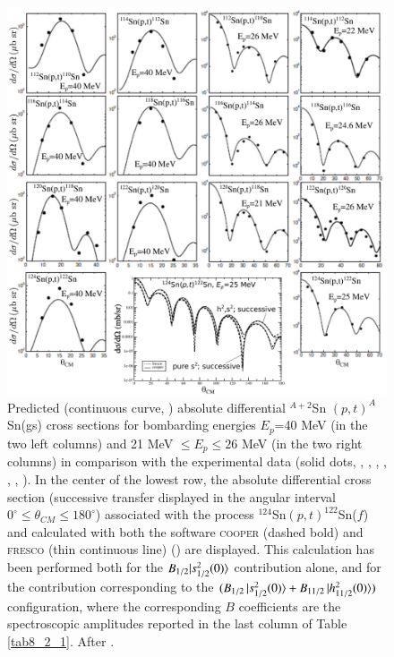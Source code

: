   \begin{figure}
  \centerline{\includegraphics*[width=15cm,angle=0]{C8/figsC8/fig8_2_4}}
  	\caption{Predicted (continuous curve, \cite{Potel:13,Potel:13b}) absolute differential $^{A+2}$Sn $(p,t)^A$Sn(gs) cross sections for bombarding
  	energies $E_p$=40 MeV (in the two left columns) and 21 MeV $\leq E_p \leq 26$ MeV (in the two right columns) in comparison with the
  	experimental data (solid dots, \cite{Bassani:65}, \cite{Guazzoni:99}, \cite{Guazzoni:04}, \cite{Guazzoni:06}, \cite{Guazzoni:08}, \cite{Guazzoni:11}, \cite{Guazzoni:12}). In the center of the lowest row, the absolute differential cross section (successive transfer displayed in the angular interval $0^\circ\leq\theta_{CM}\leq180^\circ$) associated with the process $^{124}$Sn$(p,t)^{122}$Sn($f$)  and calculated with both the software \textsc{cooper} (dashed bold) and  \textsc{fresco} (thin continuous line) (\cite{Thompson:88}) are displayed. This  calculation has been performed both for the $B_{1/2}|{s_{1/2}^2(0)} \rangle$ contribution alone, and for the contribution corresponding to the $(B_{1/2}\,|{s_{1/2}^2(0)} \rangle+B_{11/2}\,|{h_{11/2}^2(0)} \rangle)$ configuration, where the corresponding $B$ coefficients are the spectroscopic amplitudes reported in the last column of Table \ref{tab8_2_1}. 
  After \cite{Potel:13}.}\label{fig8_2_4}
  \end{figure}
  




